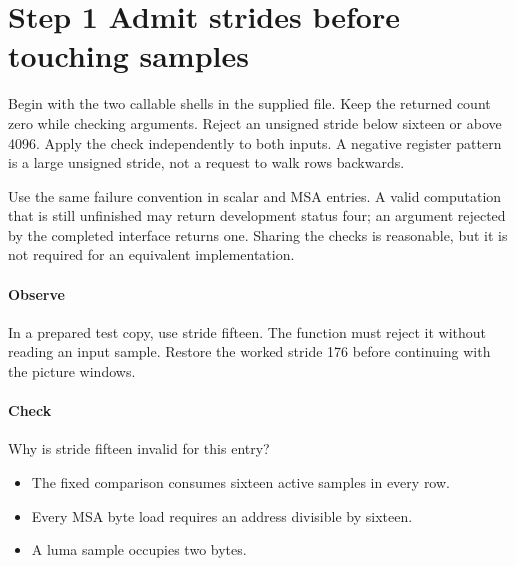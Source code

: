 \section{Step 1 Admit strides before touching samples}\label{h263-sad-s01}
Begin with the two callable shells in the supplied file. Keep the returned count
zero while checking arguments. Reject an unsigned stride below sixteen or above
4096. Apply the check independently to both inputs. A negative register pattern
is a large unsigned stride, not a request to walk rows backwards.

Use the same failure convention in scalar and MSA entries. A valid computation
that is still unfinished may return development status four; an argument rejected
by the completed interface returns one. Sharing the checks is reasonable, but it
is not required for an equivalent implementation.

\paragraph{Observe} In a prepared test copy, use stride fifteen. The function
must reject it without reading an input sample. Restore the worked stride 176
before continuing with the picture windows.
\paragraph{Check} Why is stride fifteen invalid for this entry?
\begin{itemize}
  \item[A.] The fixed comparison consumes sixteen active samples in every row.
  \item[B.] Every MSA byte load requires an address divisible by sixteen.
  \item[C.] A luma sample occupies two bytes.
\end{itemize}
